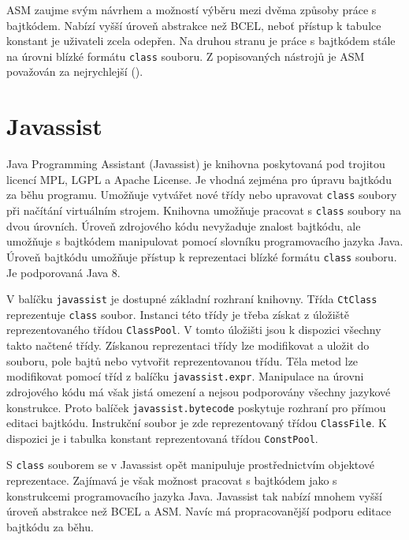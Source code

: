ASM zaujme svým návrhem a možností výběru mezi dvěma způsoby práce s bajtkódem. Nabízí vyšší úroveň abstrakce než BCEL, neboť přístup k tabulce konstant je uživateli zcela odepřen. Na druhou stranu je práce s bajtkódem stále na úrovni blízké formátu \texttt{class} souboru. Z popisovaných nástrojů je ASM považován za nejrychlejší ().


\section{Javassist}

Java Programming Assistant (Javassist) je knihovna poskytovaná pod trojitou licencí MPL, LGPL a Apache License. Je vhodná zejména pro úpravu bajtkódu za běhu programu. Umožňuje vytvářet nové třídy nebo upravovat \texttt{class} soubory při načítání virtuálním strojem. Knihovna umožňuje pracovat s \texttt{class} soubory na dvou úrovních. Úroveň zdrojového kódu nevyžaduje znalost bajtkódu, ale umožňuje s bajtkódem manipulovat pomocí slovníku programovacího jazyka Java. Úroveň bajtkódu umožňuje přístup k reprezentaci blízké formátu \texttt{class} souboru. Je podporovaná Java 8.

V balíčku \texttt{javassist} je dostupné základní rozhraní knihovny. Třída \texttt{CtClass} reprezentuje \texttt{class} soubor. Instanci této třídy je třeba získat z úložiště reprezentovaného třídou \texttt{ClassPool}. V tomto úložišti jsou k dispozici všechny takto načtené třídy. Získanou reprezentaci třídy lze modifikovat a uložit do souboru, pole bajtů nebo vytvořit reprezentovanou třídu. Těla metod lze modifikovat pomocí tříd z balíčku \texttt{javassist.expr}. Manipulace na úrovni zdrojového kódu má však jistá omezení a nejsou podporovány všechny jazykové konstrukce. Proto balíček \texttt{javassist.bytecode} poskytuje rozhraní pro přímou editaci bajtkódu. Instrukční soubor je zde reprezentovaný třídou \texttt{ClassFile}. K dispozici je i tabulka konstant reprezentovaná třídou \texttt{ConstPool}.

S \texttt{class} souborem se v Javassist opět manipuluje prostřednictvím objektové reprezentace. Zajímavá je však možnost pracovat s bajtkódem jako s konstrukcemi programovacího jazyka Java. Javassist tak nabízí mnohem vyšší úroveň abstrakce než BCEL a ASM. Navíc má propracovanější podporu editace bajtkódu za běhu.
 




